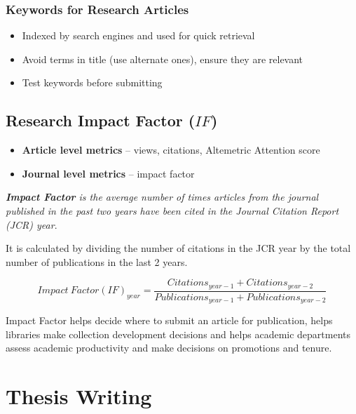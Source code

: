 \documentclass{article}
\begin{document}
\subsubsection{Keywords for Research Articles}

\begin{itemize}
    \item Indexed by search engines and used for quick retrieval
    \item Avoid terms in title (use alternate ones), ensure they are relevant
    \item Test keywords before submitting
\end{itemize}

\subsection{Research Impact Factor ($IF$)}

\begin{itemize}
    \item \textbf{Article level metrics} -- views, citations, Altemetric Attention score
    \item \textbf{Journal level metrics} -- impact factor
\end{itemize}

\textit{\textbf{Impact Factor} is the average number of times articles from the journal published in the past two years have been cited in the Journal Citation Report (JCR) year}.

It is calculated by dividing the number of citations in the JCR year by the total number of publications in the last 2 years.

\begin{equation}
    Impact\ Factor (IF)_{year} = \frac{Citations_{year-1} + Citations_{year-2}}{Publications_{year-1} + Publications_{year-2}}
\end{equation}

Impact Factor helps decide where to submit an article for publication, helps libraries make collection development decisions and helps academic departments assess academic productivity and make decisions on promotions and tenure.

\section{Thesis Writing}
\end{document}
